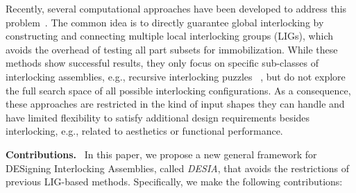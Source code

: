 Recently, several computational approaches have been developed to address this problem~\cite{Xin-2011-BurrPuzzles, Song-2012-InterCubes, Fu-2015-Furniture, Song-2016-CoFiFab, Zhang-2016-InterlockVoxel, Song-2017-ReconfigInterlock, Yao-2017-InterlockShell}.
The common idea is to directly guarantee global interlocking by constructing and connecting multiple local interlocking groups (LIGs), which avoids the overhead of testing all part subsets for immobilization.
While these methods show successful results, they only focus on specific sub-classes of interlocking assemblies, e.g., recursive interlocking puzzles ~\cite{Song-2012-InterCubes}, but do not explore the full search space of all possible interlocking configurations.
As a consequence, these approaches are restricted in the kind of input shapes they can handle and  have limited flexibility to satisfy additional design requirements besides interlocking, e.g., related to aesthetics or functional performance.


\pagebreak

\vspace*{2.0mm}
\noindent
{\bf Contributions.} \
In this paper, we propose a new general framework for DESigning Interlocking Assemblies, called {\em DESIA}, that avoids the restrictions of previous LIG-based methods.
Specifically, we make the following  contributions:



